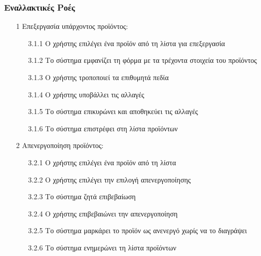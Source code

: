 \documentclass[12pt,a4paper,twoside]{book}
\begin{document}
\subsubsection{Εναλλακτικές Ροές}
\begin{enumerate}
  \item[1 ] Επεξεργασία υπάρχοντος προϊόντος:
        \begin{enumerate}
          \item[3.1.1 ] Ο χρήστης επιλέγει ένα προϊόν από τη λίστα για επεξεργασία
          \item[3.1.2 ] Το σύστημα εμφανίζει τη φόρμα με τα τρέχοντα στοιχεία του προϊόντος
          \item[3.1.3 ] Ο χρήστης τροποποιεί τα επιθυμητά πεδία %
          \item[3.1.4 ] Ο χρήστης υποβάλλει τις αλλαγές
          \item[3.1.5 ] Το σύστημα επικυρώνει και αποθηκεύει τις αλλαγές
          \item[3.1.6 ] Το σύστημα επιστρέφει στη λίστα προϊόντων
        \end{enumerate}
  \item[2 ] Απενεργοποίηση προϊόντος:
        \begin{enumerate}
          \item[3.2.1 ] Ο χρήστης επιλέγει ένα προϊόν από τη λίστα
          \item[3.2.2 ] Ο χρήστης επιλέγει την επιλογή απενεργοποίησης
          \item[3.2.3 ] Το σύστημα ζητά επιβεβαίωση
          \item[3.2.4 ] Ο χρήστης επιβεβαιώνει την απενεργοποίηση
          \item[3.2.5 ] Το σύστημα μαρκάρει το προϊόν ως ανενεργό χωρίς να το διαγράψει %
          \item[3.2.6 ] Το σύστημα ενημερώνει τη λίστα προϊόντων
        \end{enumerate}

\end{enumerate}
\end{document}
